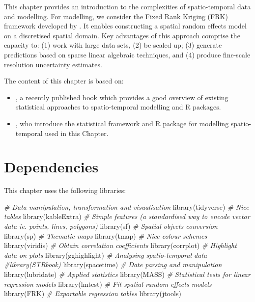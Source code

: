 \documentclass[
]{book}
\newenvironment{Shaded}{\begin{snugshade}}{\end{snugshade}}
\newcommand{\CommentTok}[1]{\textcolor[rgb]{0.56,0.35,0.01}{\textit{#1}}}
\newcommand{\FunctionTok}[1]{\textcolor[rgb]{0.00,0.00,0.00}{#1}}
\newcommand{\NormalTok}[1]{#1}
\begin{document}
This chapter provides an introduction to the complexities of spatio-temporal data and modelling. For modelling, we consider the Fixed Rank Kriging (FRK) framework developed by \citet{cressie2008fixed}. It enables constructing a spatial random effects model on a discretised spatial domain. Key advantages of this approach comprise the capacity to: (1) work with large data sets, (2) be scaled up; (3) generate predictions based on sparse linear algebraic techniques, and (4) produce fine-scale resolution uncertainty estimates.

The content of this chapter is based on:

\begin{itemize}
\item
  \citet{wikle2019spatio}, a recently published book which provides a good overview of existing statistical approaches to spatio-temporal modelling and R packages.
\item
  \citet{zammit2017frk}, who introduce the statistical framework and R package for modelling spatio-temporal used in this Chapter.
\end{itemize}

\hypertarget{dependencies-7}{%
\section{Dependencies}\label{dependencies-7}}

This chapter uses the following libraries:

\begin{Shaded}
\begin{Highlighting}[]
\CommentTok{\# Data manipulation, transformation and visualisation}
\FunctionTok{library}\NormalTok{(tidyverse)}
\CommentTok{\# Nice tables}
\FunctionTok{library}\NormalTok{(kableExtra)}
\CommentTok{\# Simple features (a standardised way to encode vector data ie. points, lines, polygons)}
\FunctionTok{library}\NormalTok{(sf) }
\CommentTok{\# Spatial objects conversion}
\FunctionTok{library}\NormalTok{(sp) }
\CommentTok{\# Thematic maps}
\FunctionTok{library}\NormalTok{(tmap) }
\CommentTok{\# Nice colour schemes}
\FunctionTok{library}\NormalTok{(viridis) }
\CommentTok{\# Obtain correlation coefficients}
\FunctionTok{library}\NormalTok{(corrplot)}
\CommentTok{\# Highlight data on plots}
\FunctionTok{library}\NormalTok{(gghighlight)}
\CommentTok{\# Analysing spatio{-}temporal data}
\CommentTok{\#library(STRbook)}
\FunctionTok{library}\NormalTok{(spacetime)}
\CommentTok{\# Date parsing and manipulation}
\FunctionTok{library}\NormalTok{(lubridate)}
\CommentTok{\# Applied statistics}
\FunctionTok{library}\NormalTok{(MASS)}
\CommentTok{\# Statistical tests for linear regression models}
\FunctionTok{library}\NormalTok{(lmtest)}
\CommentTok{\# Fit spatial random effects models}
\FunctionTok{library}\NormalTok{(FRK)}
\CommentTok{\# Exportable regression tables}
\FunctionTok{library}\NormalTok{(jtools)}
\end{Highlighting}
\end{Shaded}
\end{document}
